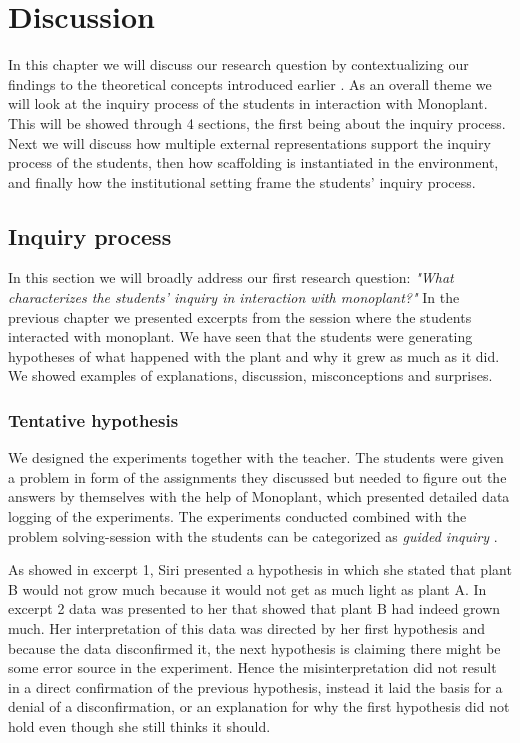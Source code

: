 \chapter{Discussion}
In this chapter we will discuss our research question by contextualizing our findings to the theoretical concepts introduced earlier . As an overall theme we will look at the inquiry process of the students in interaction with Monoplant. This will be showed through 4 sections, the first being about the inquiry process. Next we will discuss how multiple external representations support the inquiry process of the students, then how scaffolding is instantiated in the environment, and finally how the institutional setting frame the students' inquiry process.


\section{Inquiry process}
In this section we will broadly address our first research question: \emph{"What characterizes the students’ inquiry in interaction with monoplant?"}
In the previous chapter we presented excerpts from the session where the students interacted with monoplant. We have seen that the students were generating hypotheses of what happened with the plant and why it grew as much as it did. We showed examples of explanations, discussion, misconceptions and surprises.

\subsection{Tentative hypothesis}
We designed the experiments together with the teacher. The students were given a problem in form of the assignments they discussed but needed to figure out the answers by themselves with the help of Monoplant, which presented detailed data logging of the experiments. The experiments conducted combined with the problem solving-session with the students can be categorized as \emph{guided inquiry}  \citetext{\citet{staver1987analysis}, referenced in \citealp{prince2006inductive}}. 

As showed in excerpt 1, Siri presented a hypothesis in which she stated that plant B would not grow much because it would not get as much light as plant A. In excerpt 2 data was presented to her that showed that plant B had indeed grown much. Her interpretation of this data was directed by her first hypothesis and because the data disconfirmed it, the next hypothesis is claiming there might be some error source in the experiment. Hence the misinterpretation did not result in a direct confirmation of the previous hypothesis, instead it laid the basis for a denial of a disconfirmation, or an explanation for why the first hypothesis did not hold even though she still thinks it should.


